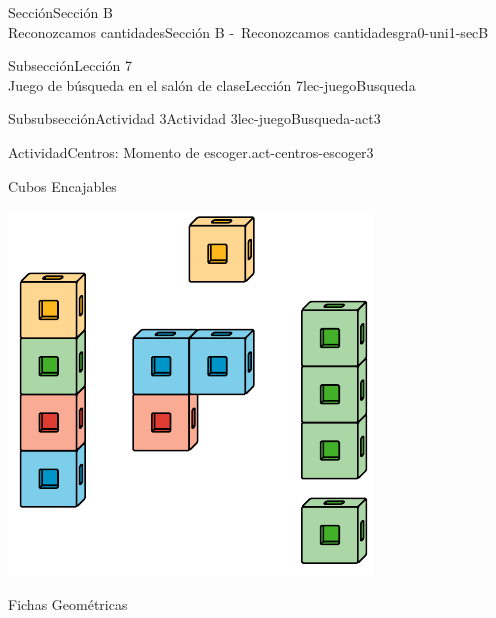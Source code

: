 \begin{sectionptx}{Sección}{{\Large Sección B\\}Reconozcamos cantidades}{}{Sección B -~Reconozcamos cantidades}{}{}{gra0-uni1-secB}
\begin{subsectionptx}{Subsección}{{\normalsize Lección 7\\[-0.05cm]}Juego de búsqueda en el salón de clase}{}{Lección 7}{}{}{lec-juegoBusqueda}
\begin{subsubsectionptx}{Subsubsección}{Actividad 3}{}{Actividad 3}{}{}{lec-juegoBusqueda-act3}
\begin{activity}{Actividad}{Centros: Momento de escoger.}{act-centros-escoger3}
\begin{sidebyside}{2}{0.025}{0.025}{0.05}
\begin{sbspanel}{0.45}%
Cubos Encajables%
\par
\includegraphics[max width=\linewidth, center]{external/svg-source/tikz-file-128850.pdf}
\end{sbspanel}%
\begin{sbspanel}{0.45}%
Fichas Geométricas%
\par

\end{sbspanel}
\end{sidebyside}
\end{activity}
\end{subsubsectionptx}
\end{subsectionptx}
\end{sectionptx}
